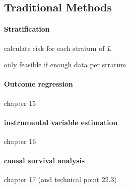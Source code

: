 \documentclass[8pt,oneside]{extarticle}
\begin{document}
\subsection{Traditional Methods}

\begin{multicols}{2}




\paragraph{\large Stratification}  calculate risk for each stratum of $L$

\noindent only feasible if enough data per stratum
















\paragraph{Outcome regression} chapter 15

\vspace{20em}

\paragraph{instrumental variable estimation} chapter 16

\vspace{20em}

\paragraph{causal survival analysis} chapter 17 (and technical point 22.3)

\vspace{20em}







\end{multicols}




\end{document}
